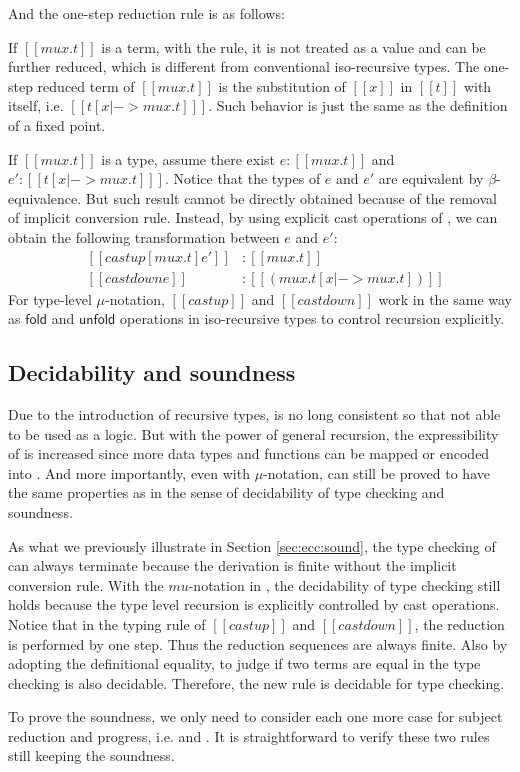 \begin{figure}[ht]
	\ottusedrule{\ottdruleTXXMu{}}
\end{figure}

And the one-step reduction rule is as follows:

\begin{figure}[ht]
	\ottusedrule{\ottdruleSXXMu{}}
\end{figure}

If $[[mu x . t]]$ is a term, with the  rule, it is not treated as a value and can be further reduced, which is different from conventional iso-recursive types. The one-step reduced term of $[[mu x . t]]$ is the substitution of $[[x]]$ in $[[t]]$ with itself, i.e. $[[t [x |-> mu x . t] ]]$. Such behavior is just the same as the definition of a fixed point.

If $[[mu x . t]]$ is a type, assume there exist $e : [[mu x . t]]$ and $e' : [[t [x |-> mu x . t] ]]$. Notice that the types of $e$ and $e'$ are equivalent by $\beta$-equivalence. But such result cannot be directly obtained because of the removal of implicit conversion rule. Instead, by using explicit cast operations of \expcc, we can obtain the following transformation between $e$ and $e'$:
\[\begin{array}{lll}
	&[[castup [mu x . t] e']] &: [[mu x . t]]\\
	&[[castdown e]] &: [[(mu x . t [x |-> mu x . t])]]
\end{array}\]
For type-level $\mu$-notation, $[[castup]]$ and $[[castdown]]$ work in the same way as $\textsf{fold}$ and $\textsf{unfold}$ operations in iso-recursive types to control recursion explicitly.

\subsection{Decidability and soundness}

Due to the introduction of recursive types, \name is no long consistent so that not able to be used as a logic. But with the power of general recursion, the expressibility of \name is increased since more data types and functions can be mapped or encoded into \name. And more importantly, even with $\mu$-notation, \name can still be proved to have the same properties as \name in the sense of decidability of type checking and soundness.

As what we previously illustrate in Section \ref{sec:ecc:sound}, the type checking of \expcc can always terminate because the derivation is finite without the implicit conversion rule. With the $mu$-notation in \name, the decidability of type checking still holds because the type level recursion is explicitly controlled by cast operations. Notice that in the typing rule of $[[castup]]$ and $[[castdown]]$, the reduction is performed by one step. Thus the reduction sequences are always finite. Also by adopting the definitional equality, to judge if two terms are equal in the type checking is also decidable. Therefore, the new  rule is decidable for type checking.

To prove the soundness, we only need to consider each one more case for subject reduction and progress, i.e.  and . It is straightforward to verify these two rules still keeping the soundness.
